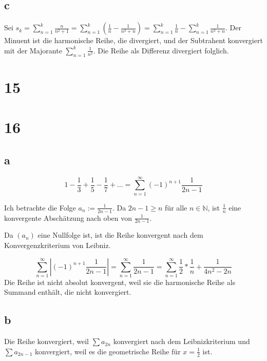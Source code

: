 \documentclass[a4paper,10pt]{article}
\begin{document}
\subsection*{c}

Sei $s_k = \sum_{n = 1}^k \frac{n}{n^2 + 1} = \sum_{n = 1}^k (\frac{1}{n} - \frac{1}{n^3 + n}) = \sum_{n = 1}^k \frac{1}{n} - \sum_{n = 1}^k \frac{1}{n^3 + n}$.
Der Minuent ist die harmonische Reihe, die divergiert, und der Subtrahent konvergiert mit der Majorante $\sum_{n = 1}^k \frac{1}{n^2}$.
Die Reihe als Differenz divergiert folglich.

\section*{15}



\section*{16}

\subsection*{a}

\begin{equation}
 1 - \frac{1}{3} + \frac{1}{5} - \frac{1}{7} + \dots = \sum_{n = 1}^\infty (-1)^{n + 1}\frac{1}{2n - 1}
\end{equation}

Ich betrachte die Folge $a_n := \frac{1}{2n - 1}$.
Da $2n - 1 \ge n$ für alle $n \in \mathbb{N}$, ist $\frac{1}{n}$ eine konvergente Abschätzung nach oben von $\frac{1}{2n - 1}$.

Da $(a_n)$ eine Nullfolge ist, ist die Reihe konvergent nach dem Konvergenzkriterium von Leibniz.

\begin{equation}
 \sum_{n = 1}^\infty |(-1)^{n + 1}\frac{1}{2n - 1}| = \sum_{n = 1}^\infty \frac{1}{2n - 1} = \sum_{n = 1}^\infty \frac{1}{2} * \frac{1}{n} + \frac{1}{4n^2 - 2n}
\end{equation}
Die Reihe ist nicht absolut konvergent, weil sie die harmonische Reihe als Summand enthält, die nicht konvergiert.

\subsection*{b}

Die Reihe konvergiert, weil $\sum a_{2n}$ konvergiert nach dem Leibnizkriterium und $\sum a_{2n - 1}$ konvergiert, weil es die geometrische Reihe für $x = \frac{1}{2}$ ist.
\end{document}
